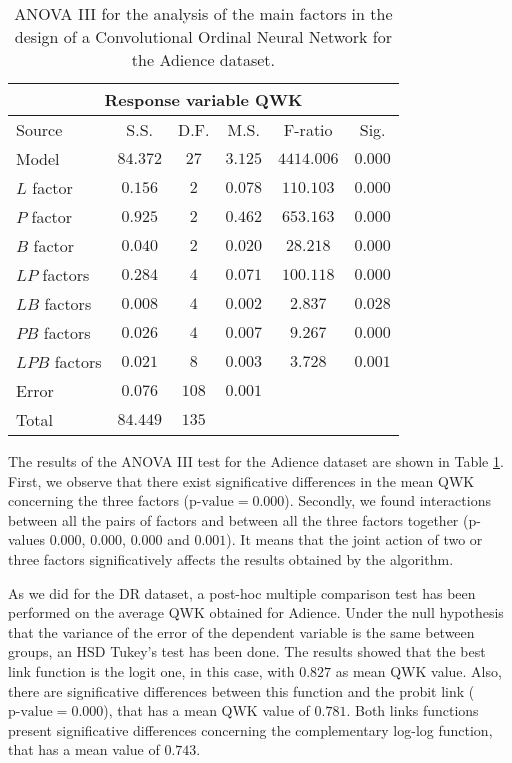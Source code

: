 \documentclass[journal]{IEEEtran}
\begin{document}
	\begin{table}[!t]
		\caption{ANOVA III for the analysis of the main factors in the design of a Convolutional Ordinal Neural Network for the Adience dataset.}
		\label{table:ANOVAAdience}
		\centering
		\small
		\begin{tabular}{l|ccccc}
			            \multicolumn{6}{c}{Response variable QWK}             \\ \hline
			Source        &   S.S.   & D.F.  &  M.S.   &  F-ratio   &  Sig.   \\ \hline
			Model         & $84.372$ & $27$  & $3.125$ & $4414.006$ & $0.000$ \\
			$L$ factor    & $0.156$  &  $2$  & $0.078$ & $110.103$  & $0.000$ \\
			$P$ factor    & $0.925$  &  $2$  & $0.462$ & $653.163$  & $0.000$ \\
			$B$ factor    & $0.040$  &  $2$  & $0.020$ &  $28.218$  & $0.000$ \\
			$LP$ factors  & $0.284$  &  $4$  & $0.071$ & $100.118$  & $0.000$ \\
			$LB$ factors  & $0.008$  &  $4$  & $0.002$ &  $2.837$   & $0.028$ \\
			$PB$ factors  & $0.026$  &  $4$  & $0.007$ &  $9.267$   & $0.000$ \\
			$LPB$ factors & $0.021$  &  $8$  & $0.003$ &  $3.728$   & $0.001$ \\
			Error         & $0.076$  & $108$ & $0.001$ &            &  \\ \hline
			Total         & $84.449$ & $135$ &         &            &
		\end{tabular}
	\end{table}
	
	The results of the ANOVA III test for the Adience dataset are shown in Table \ref{table:ANOVAAdience}. First, we observe that there exist significative differences in the mean QWK concerning the three factors ($\text{p-value} = 0.000$). Secondly, we found interactions between all the pairs of factors and between all the three factors together (p-values $0.000$, $0.000$, $0.000$ and $0.001$). It means that the joint action of two or three factors significatively affects the results obtained by the algorithm.
	
	As we did for the DR dataset, a post-hoc multiple comparison test has been performed on the average QWK obtained for Adience. Under the null hypothesis that the variance of the error of the dependent variable is the same between groups, an HSD Tukey's test has been done. The results showed that the best link function is the logit one, in this case, with $0.827$ as mean QWK value. Also, there are significative differences between this function and the probit link ($\text{p-value} = 0.000$), that has a mean QWK value of $0.781$. Both links functions present significative differences concerning the complementary log-log function, that has a mean value of $0.743$.
	
\end{document}
